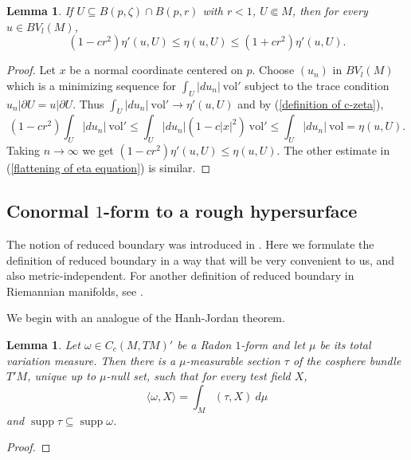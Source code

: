 \documentclass[reqno,12pt,letterpaper]{amsart}
\DeclareMathOperator{\supp}{supp}
\newcommand{\vol}{\mathrm{vol}}
\newtheorem{lemma}[theorem]{Lemma}
\theoremstyle{definition}
\numberwithin{equation}{section}
\begin{document}
\begin{lemma}\label{flattening of eta}
If $U \subseteq B(p, \zeta) \cap B(p, r)$ with $r < 1$, $U \Subset M$, then for every $u \in BV_l(M)$,
\begin{equation}\label{flattening of eta equation}
(1 - cr^2) \eta'(u, U) \leq \eta(u, U) \leq (1 + cr^2) \eta'(u, U).
\end{equation}
\end{lemma}
\begin{proof}
Let $x$ be a normal coordinate centered on $p$.
Choose $(u_n)$ in $BV_l(M)$ which is a minimizing sequence for $\int_U |du_n| ~\vol'$ subject to the trace condition $u_n|\partial U = u|\partial U$.
Thus $\int_U |du_n| ~\vol' \to \eta'(u, U)$ and by (\ref{definition of c-zeta}),
$$(1 - cr^2) \int_U |du_n| ~\vol' \leq \int_U |du_n| (1 - c|x|^2) ~\vol' \leq \int_U |du_n| ~\vol = \eta(u, U).$$
Taking $n \to \infty$ we get $(1 - cr^2) \eta'(u, U) \leq \eta(u, U)$.
The other estimate in (\ref{flattening of eta equation}) is similar.
\end{proof}


\subsection{Conormal $1$-form to a rough hypersurface} \label{conormal section}
The notion of reduced boundary was introduced in \cite{deGiorgi55}.
Here we formulate the definition of reduced boundary in a way that will be very convenient to us, and also metric-independent.
For another definition of reduced boundary in Riemannian manifolds, see \cite{Battista_2021}.

We begin with an analogue of the Hanh-Jordan theorem.

\begin{lemma}
Let $\omega \in C_c(M, TM)'$ be a Radon $1$-form and let $\mu$ be its total variation measure.
Then there is a $\mu$-measurable section $\tau$ of the cosphere bundle $T'M$, unique up to $\mu$-null set, such that for every test field $X$,
$$\langle \omega, X\rangle = \int_M (\tau, X) ~d\mu$$
and $\supp \tau \subseteq \supp \omega$.
\end{lemma}
\begin{proof}
\end{proof}
\end{document}
